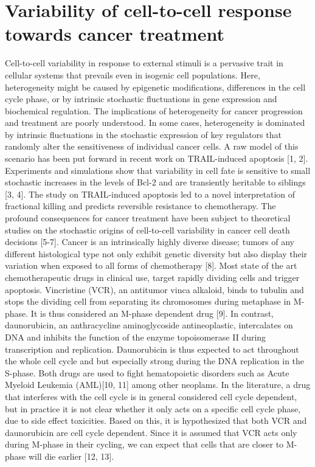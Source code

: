 \documentclass[pdftex,12pt,a4paper]{report}
\begin{document}



\section{Variability of cell-to-cell response towards cancer treatment}


Cell-to-cell variability in response to external stimuli is a pervasive trait in cellular systems that prevails even in isogenic cell populations. Here, heterogeneity might be caused by epigenetic modifications, differences in the cell cycle phase, or by intrinsic stochastic fluctuations in gene expression and biochemical regulation. The implications of heterogeneity for cancer progression and treatment are poorly understood. In some cases, heterogeneity is dominated by intrinsic fluctuations in the stochastic expression of key regulators that randomly alter the sensitiveness of individual cancer cells. A raw model of this scenario has been put forward in recent work on TRAIL-induced apoptosis [1, 2]. Experiments and simulations show that variability in cell fate is sensitive to small stochastic increases in the levels of Bcl-2 and are transiently heritable to siblings [3, 4]. The study on TRAIL-induced apoptosis led to a novel interpretation of fractional killing and predicts reversible resistance to chemotherapy. The profound consequences for cancer treatment have been subject to theoretical studies on the stochastic origins of cell-to-cell variability in cancer cell death decisions [5-7]. 
Cancer is an intrinsically highly diverse disease; tumors of any different histological type not only exhibit genetic diversity but also display their variation when exposed to all forms of chemotherapy [8]. Most state of the art chemotherapeutic drugs in clinical use, target rapidly dividing cells and trigger apoptosis. Vincristine (VCR), an antitumor vinca alkaloid, binds to tubulin and stops the dividing cell from separating its chromosomes during metaphase in M-phase. It is thus considered an M-phase dependent drug [9]. In contrast, daunorubicin, an anthracycline aminoglycoside antineoplastic, intercalates on DNA and inhibits the function of the enzyme topoisomerase II during transcription and replication. Daunorubicin is thus expected to act throughout the whole cell cycle and but especially strong during the DNA replication in the S-phase. Both drugs are used to fight hematopoietic disorders such as Acute Myeloid Leukemia (AML)[10, 11] among other neoplams. In the literature, a drug that interferes with the cell cycle is in general considered cell cycle dependent, but in practice it is not clear whether it only acts on a specific cell cycle phase, due to side effect toxicities. Based on this, it is hypothesized that both VCR and daunorubicin are cell cycle dependent. Since it is assumed that VCR acts only during M-phase in their cycling, we can expect that cells that are closer to M-phase will die earlier [12, 13].  
\end{document}
